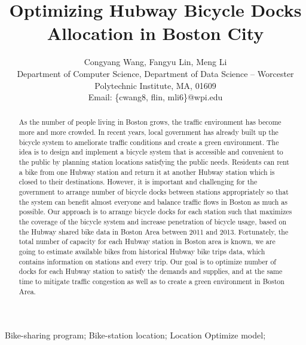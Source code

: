 \documentclass[journal, letterpaper]{IEEEtran}
\begin{document}
\title{Optimizing Hubway Bicycle Docks Allocation in Boston City}
\author{Congyang Wang, Fangyu Lin, Meng Li \\ Department of Computer Science, Department of Data Science -- Worcester Polytechnic Institute, MA, 01609 \\ Email: \{cwang8, flin, mli6\}@wpi.edu}
\maketitle

\begin{abstract} 
\large As the number of people living in Boston grows, the traffic environment has become more and more crowded. In recent years, local government has already built up the bicycle system to ameliorate traffic conditions and create a green environment. The idea is to design and implement a bicycle system that is accessible and convenient to the public by planning station locations satisfying the public needs. Residents can rent a bike from one Hubway station and return it at another Hubway station which is closed to their destinations. However, it is important and challenging for the government to arrange number of bicycle docks between stations appropriately so that the system can benefit almost everyone and balance traffic flows in Boston as much as possible. Our approach is to arrange bicycle docks for each station such that maximizes the coverage of the bicycle system and increase penetration of bicycle usage, based on the Hubway shared bike data in Boston Area between 2011 and 2013. Fortunately, the total number of capacity for each Hubway station in Boston area is known, we are going to estimate available bikes from historical Hubway bike trips data, which contains information on stations and every trip. Our goal is to optimize number of docks for each Hubway station to satisfy the demands and supplies, and at the same time to mitigate traffic congestion as well as to create a green environment in Boston Area. 
\end{abstract}

\begin{IEEEkeywords}
Bike-sharing program;
Bike-station location;
Location Optimize model;
\end{IEEEkeywords}
\end{document}
